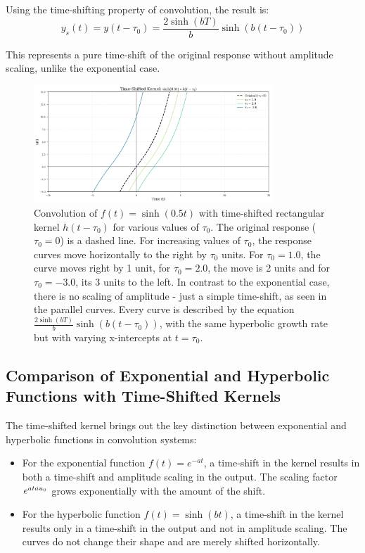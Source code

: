 	Using the time-shifting property of convolution, the result is:
	\begin{equation}
		y_s(t) = y(t-\tau_0) = \frac{2\sinh(bT)}{b}\sinh(b(t-\tau_0))
	\end{equation}
	
	This represents a pure time-shift of the original response without amplitude scaling, unlike the exponential case.
	
	\begin{figure}[htbp]
		\centering
		\includegraphics[width=0.8\textwidth]{figs/hyper_time_shift_extended.png}
		\caption{Convolution of $f(t) = \sinh(0.5t)$ with time-shifted rectangular kernel $h(t-\tau_0)$ for various values of $\tau_0$. The original response ($\tau_0 = 0$) is a dashed line. For increasing values of $\tau_0$, the response curves move horizontally to the right by $\tau_0$ units. For $\tau_0 = 1.0$, the curve moves right by 1 unit, for $\tau_0 = 2.0$, the move is 2 units and for $\tau_0 = -3.0$, its 3 units to the left. In contrast to the exponential case, there is no scaling of amplitude - just a simple time-shift, as seen in the parallel curves. Every curve is described by the equation $\frac{2\sinh(bT)}{b}\sinh(b(t-\tau_0))$, with the same hyperbolic growth rate but with varying x-intercepts at $t = \tau_0$.}
	\end{figure}
	
	\subsection{Comparison of Exponential and Hyperbolic Functions with Time-Shifted Kernels}
	The time-shifted kernel brings out the key distinction between exponential and hyperbolic functions in convolution systems:
	
	
	\begin{itemize}
		\item For the exponential function $f(t) = e^{-at}$, a time-shift in the kernel results in both a time-shift and amplitude scaling in the output. The scaling factor $e^{a\\tau_0}$ grows exponentially with the amount of the shift.
		\item For the hyperbolic function $f(t) = \sinh(bt)$, a time-shift in the kernel results only in a time-shift in the output and not in amplitude scaling. The curves do not change their shape and are merely shifted horizontally.
	\end{itemize}

